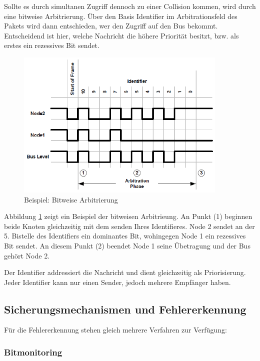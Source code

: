 Sollte es durch simultanen Zugriff dennoch zu einer Collision kommen, wird durch eine bitweise Arbitrierung.
Über den Basis Identifier im Arbitrationsfeld des Pakets wird dann entschieden, wer den Zugriff auf den Bus bekommt.
Entscheidend ist hier, welche Nachricht die höhere Priorität besitzt, bzw. als erstes ein rezessives Bit sendet.

\begin{figure}[h] 
\centering
\includegraphics[width=0.9\textwidth]{figures/bitwisearb}
\caption{Beispiel: Bitweise Arbitrierung \citep{BWA}} 
\label{pic:bitwise}
\end{figure} 

Abbildung \ref{pic:bitwise} zeigt ein Beispiel der bitweisen Arbitrieung. An Punkt (1) beginnen beide 
Knoten gleichzeitig mit dem senden Ihres Identifieres. Node 2 sendet an der 5. Bistelle des Identifiers 
ein dominantes Bit, wohingegen Node 1 ein rezessives Bit sendet. An diesem Punkt (2) beendet 
Node 1 seine Übetragung und der Bus gehört Node 2.

Der Identifier addressiert die Nachricht und dient gleichzeitig als Priorisierung. Jeder Identifier kann 
nur einen Sender, jedoch mehrere Empfänger haben.

\subsection{Sicherungsmechanismen und Fehlererkennung}
\label{sec:security}

Für die Fehlererkennung stehen gleich mehrere Verfahren zur Verfügung:

\subsubsection{Bitmonitoring}

